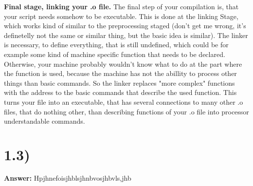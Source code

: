 \documentclass{article}
\begin{document}
\singlespacing

\textbf{Final stage, linking your .o file.} The final step of your compilation is, that your script needs somehow to be executable. This is done at the linking Stage, which works kind of similar to the preprocessing staged (don't get me wrong, it's definetelly not the same or similar thing, but the basic idea is similar). The linker is necessary, to define everything, that is still undefined, which could be for example some kind of machine specific function that needs to be declared. Otherwise, your machine probably wouldn't know what to do at the part where the function is used, because the machine has not the abillity to process other things than basic commands. So the linker replaces "more complex" functions with the address to the  basic commands that describe the used function. This turns your file into an executable, that has several connections to many other .o files, that do nothing other, than describing functions of your .o file into processor understandable commands.

\section{1.3)}

\textbf{Answer:} Hpjhnefoisjhblsjhnbvosjhbvls,jhb
\end{document}
